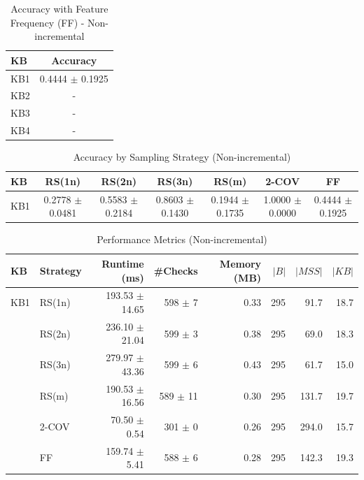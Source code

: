 \begin{table}[htbp]
\centering
\caption{Accuracy with Feature Frequency (FF) - Non-incremental}
\label{tab:table11_non-incremental}
\begin{tabular}{lc}
\toprule
KB & Accuracy \\
\midrule
KB1 & 0.4444 $\pm$ 0.1925 \\
KB2 & - \\
KB3 & - \\
KB4 & - \\
\bottomrule
\end{tabular}
\end{table}

\begin{table}[htbp]
\centering
\caption{Accuracy by Sampling Strategy (Non-incremental)}
\label{tab:accuracy_non-incremental}
\begin{tabular}{lcccccc}
\toprule
KB & RS(1n) & RS(2n) & RS(3n) & RS(m) & 2-COV & FF \\
\midrule
KB1 & 0.2778 $\pm$ 0.0481 & 0.5583 $\pm$ 0.2184 & 0.8603 $\pm$ 0.1430 & 0.1944 $\pm$ 0.1735 & 1.0000 $\pm$ 0.0000 & 0.4444 $\pm$ 0.1925 \\
\bottomrule
\end{tabular}
\end{table}

\begin{table}[htbp]
\centering
\caption{Performance Metrics (Non-incremental)}
\label{tab:performance_non-incremental}
\begin{tabular}{llrrrrrr}
\toprule
KB & Strategy & Runtime (ms) & \#Checks & Memory (MB) & $|B|$ & $|MSS|$ & $|KB|$ \\
\midrule
KB1 & RS(1n) & 193.53 $\pm$ 14.65 & 598 $\pm$ 7 & 0.33 & 295 & 91.7 & 18.7 \\
 & RS(2n) & 236.10 $\pm$ 21.04 & 599 $\pm$ 3 & 0.38 & 295 & 69.0 & 18.3 \\
 & RS(3n) & 279.97 $\pm$ 43.36 & 599 $\pm$ 6 & 0.43 & 295 & 61.7 & 15.0 \\
 & RS(m) & 190.53 $\pm$ 16.56 & 589 $\pm$ 11 & 0.30 & 295 & 131.7 & 19.7 \\
 & 2-COV & 70.50 $\pm$ 0.54 & 301 $\pm$ 0 & 0.26 & 295 & 294.0 & 15.7 \\
 & FF & 159.74 $\pm$ 5.41 & 588 $\pm$ 6 & 0.28 & 295 & 142.3 & 19.3 \\
\bottomrule
\end{tabular}
\end{table}

